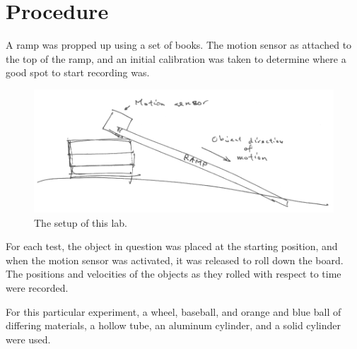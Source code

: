 \section{Procedure}

A ramp was propped up using a set of books.
The motion sensor as attached to the top of the ramp, and an initial calibration was taken to determine where a good spot to start recording was.

\begin{figure}[h]

\begin{center}
\includegraphics[scale=0.5]{content/fig1}
\end{center}

\caption{The setup of this lab.}

\end{figure}

For each test, the object in question was placed at the starting position, and when the motion sensor was activated, it was released to roll down the board.
The positions and velocities of the objects as they rolled with respect to time were recorded.

For this particular experiment, a wheel, baseball, and orange and blue ball of differing materials, a hollow tube, an aluminum cylinder, and a solid cylinder were used.

